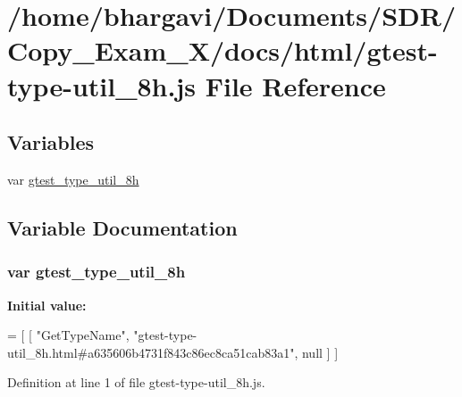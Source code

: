\hypertarget{gtest-type-util__8h_8js}{}\section{/home/bhargavi/\+Documents/\+S\+D\+R/\+Copy\+\_\+\+Exam\+\_\+X/docs/html/gtest-\/type-\/util\+\_\+8h.js File Reference}
\label{gtest-type-util__8h_8js}
\subsection*{Variables}
\begin{DoxyCompactItemize}
\item 
var \hyperlink{gtest-type-util__8h_8js_afa955b2f34e2e5a3695b1060946dba54}{gtest\+\_\+type\+\_\+util\+\_\+8h}
\end{DoxyCompactItemize}


\subsection{Variable Documentation}
\subsubsection[{\texorpdfstring{gtest\+\_\+type\+\_\+util\+\_\+8h}{gtest_type_util_8h}}]{\setlength{\rightskip}{0pt plus 5cm}var gtest\+\_\+type\+\_\+util\+\_\+8h}\hypertarget{gtest-type-util__8h_8js_afa955b2f34e2e5a3695b1060946dba54}{}\label{gtest-type-util__8h_8js_afa955b2f34e2e5a3695b1060946dba54}
{\bfseries Initial value\+:}
\begin{DoxyCode}
=
[
    [ \textcolor{stringliteral}{"GetTypeName"}, \textcolor{stringliteral}{"gtest-type-util\_8h.html#a635606b4731f843c86ec8ca51cab83a1"}, null ]
]
\end{DoxyCode}


Definition at line 1 of file gtest-\/type-\/util\+\_\+8h.\+js.

